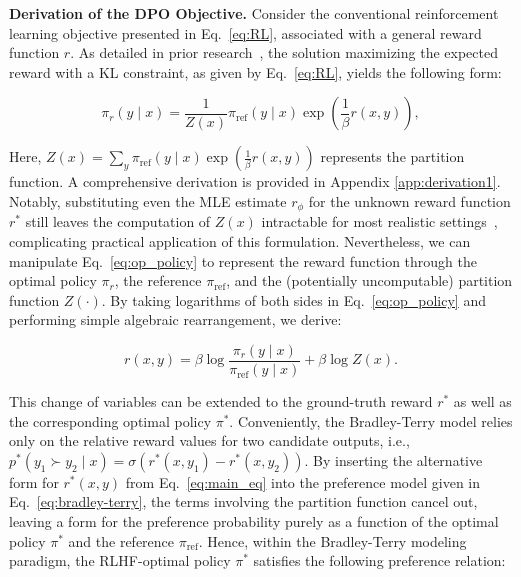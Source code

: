 \textbf{Derivation of the DPO Objective.} Consider the conventional reinforcement learning objective presented in Eq.~\ref{eq:RL}, associated with a general reward function $r$. As detailed in prior research~\citep{peters2007reinforcement, peng2019advantage, korbak2022reinforcement, go2023aligning}, the solution maximizing the expected reward with a KL constraint, as given by Eq.~\ref{eq:RL}, yields the following form:

\begin{equation}\label{eq:op_policy}
    \pi_r(y\mid x) = \frac{1}{Z(x)}\pi_\text{ref}(y\mid x)\exp\left(\frac{1}{\beta}r(x, y)\right),
\end{equation}

Here, $Z(x) =\sum_{y}\pi_\text{ref}(y\mid x)\exp\left(\frac{1}{\beta}r(x, y)\right)$ represents the partition function. A comprehensive derivation is provided in Appendix \ref{app:derivation1}. Notably, substituting even the MLE estimate $r_{\phi}$ for the unknown reward function $r^*$ still leaves the computation of $Z(x)$ intractable for most realistic settings~\citep{korbak2022reinforcement, go2023aligning}, complicating practical application of this formulation. Nevertheless, we can manipulate Eq.~\ref{eq:op_policy} to represent the reward function through the optimal policy $\pi_r$, the reference $\pi_\text{ref}$, and the (potentially uncomputable) partition function $Z(\cdot)$. By taking logarithms of both sides in Eq.~\ref{eq:op_policy} and performing simple algebraic rearrangement, we derive:

\begin{equation}\label{eq:main_eq}
    r(x,y) =\beta \log \frac{\pi_r(y\mid x)}{\pi_\text{ref}(y\mid x)} + \beta \log Z(x).
\end{equation}

This change of variables can be extended to the ground-truth reward $r^*$ as well as the corresponding optimal policy $\pi^*$. Conveniently, the Bradley-Terry model relies only on the relative reward values for two candidate outputs, i.e., ${p^*(y_1 \succ y_2 \mid x) = \sigma(r^*(x, y_1) - r^*(x, y_2))}$. By inserting the alternative form for $r^*(x,y)$ from Eq.~\ref{eq:main_eq} into the preference model given in Eq.~\ref{eq:bradley-terry}, the terms involving the partition function cancel out, leaving a form for the preference probability purely as a function of the optimal policy $\pi^*$ and the reference $\pi_\text{ref}$. Hence, within the Bradley-Terry modeling paradigm, the RLHF-optimal policy $\pi^*$ satisfies the following preference relation:

